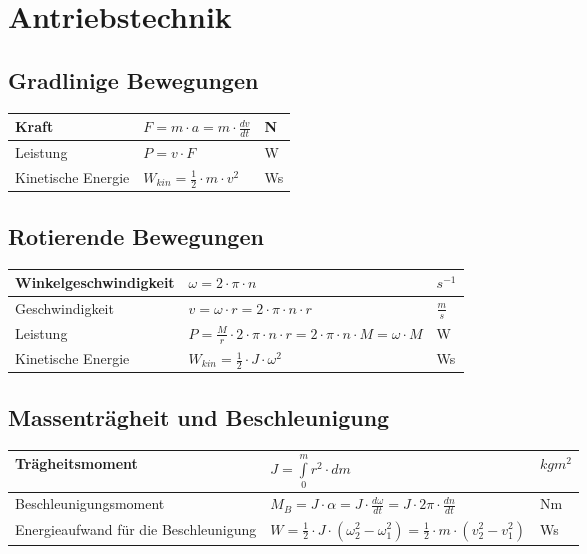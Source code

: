 \section{Antriebstechnik}
\renewcommand{\arraystretch}{1.1}
\subsection{Gradlinige Bewegungen}
\begin{tabular}[c]{ | p{5cm} | p{8cm} | p{4cm} | }
	\hline
	Kraft & $F=m\cdot a=m\cdot\frac{dv}{dt}$ & N \\
	\hline
	Leistung & $P=v\cdot F$ & W \\
	\hline
	Kinetische Energie & $W_{kin}=\frac{1}{2}\cdot m \cdot v^2$ & Ws \\
	\hline
\end{tabular}

\subsection{Rotierende Bewegungen}
\begin{tabular}[c]{ | p{5cm} | p{8cm} | p{4cm} | }
	\hline
	Winkelgeschwindigkeit & $\omega = 2\cdot\pi\cdot n$ & $s^{-1}$ \\
	\hline
	Geschwindigkeit & $v=\omega \cdot r = 2 \cdot\pi\cdot n \cdot r$ &
	$\frac{m}{s}$
	\\
	\hline
	Leistung & $P=\frac{M}{r}\cdot 2 \cdot\pi\cdot n \cdot r = 2\cdot\pi\cdot n
	\cdot M = \omega \cdot M$ & W \\
	\hline
	Kinetische Energie & $W_{kin}=\frac{1}{2}\cdot J \cdot\omega^2$ & Ws \\
	\hline
\end{tabular}

\subsection{Massenträgheit und Beschleunigung}
\begin{tabular}[c]{ | p{8cm} | p{7cm} | p{2cm} | }
	\hline
	Trägheitsmoment & $J=\int\limits_{0}^mr^2\cdot dm$ & $kgm^2$ \\
	\hline
	Beschleunigungsmoment & $M_B=J\cdot\alpha = J\cdot\frac{d\omega}{dt}=J\cdot
	2\pi\cdot\frac{dn}{dt}$ & Nm\\
	\hline
	Energieaufwand für die Beschleunigung & $W=\frac{1}{2}\cdot J \cdot
	\left(\omega_2^2-\omega_1^2\right) = \frac{1}{2}\cdot
	m\cdot\left(v_2^2-v_1^2\right)$ & Ws\\
	\hline
\end{tabular}

